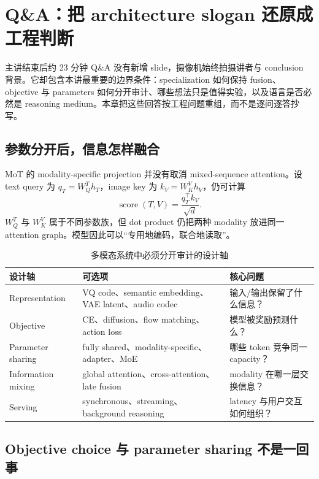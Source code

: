 \section{Q\&A：把 architecture slogan 还原成工程判断}

主讲结束后约 23 分钟 Q\&A 没有新增 slide，摄像机始终拍摄讲者与 conclusion 背景。它却包含本讲最重要的边界条件：specialization 如何保持 fusion、objective 与 parameters 如何分开审计、哪些想法只是值得实验，以及语言是否必然是 reasoning medium。本章把这些回答按工程问题重组，而不是逐问逐答抄写。

\subsection{参数分开后，信息怎样融合}

MoT 的 modality-specific projection 并没有取消 mixed-sequence attention。设 text query 为 $q_T=W_Q^T h_T$，image key 为 $k_V=W_K^V h_V$，仍可计算
$$
\operatorname{score}(T,V)=\frac{q_T^\top k_V}{\sqrt{d}}.
$$
$W_Q^T$ 与 $W_K^V$ 属于不同参数族，但 dot product 仍把两种 modality 放进同一 attention graph。模型因此可以“专用地编码，联合地读取”。


\begin{table}[H]
\centering
\small
\begin{tabularx}{0.98\textwidth}{L{0.23\textwidth}Y Y}
\toprule
设计轴 & 可选项 & 核心问题 \\
\midrule
Representation & VQ code、semantic embedding、VAE latent、audio codec & 输入/输出保留了什么信息？ \\
Objective & CE、diffusion、flow matching、action loss & 模型被奖励预测什么？ \\
Parameter sharing & fully shared、modality-specific、adapter、MoE & 哪些 token 竞争同一 capacity？ \\
Information mixing & global attention、cross-attention、late fusion & modality 在哪一层交换信息？ \\
Serving & synchronous、streaming、background reasoning & latency 与用户交互如何组织？ \\
\bottomrule
\end{tabularx}
\caption{多模态系统中必须分开审计的设计轴}
\end{table}

\subsection{Objective choice 与 parameter sharing 不是一回事}

